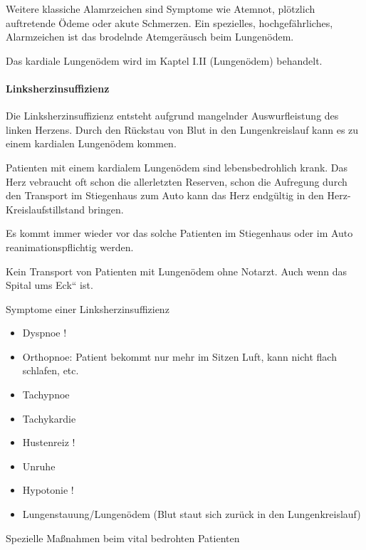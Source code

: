 \documentclass{article}
\begin{document}
Weitere klassiche Alamrzeichen sind Symptome wie Atemnot, pl\"otzlich
auftretende \"Odeme oder akute Schmerzen. Ein spezielles,
hochgef\"ahrliches, Alarmzeichen ist das brodelnde Atemger\"ausch beim
Lungen\"odem. 

Das kardiale Lungen\"odem wird im Kaptel
I.II{\guillemotright}\pageref{bkm:RefHeading36561325} (Lungen\"odem)
behandelt. 

\paragraph[Linksherzinsuffizienz]{Linksherzinsuffizienz}
Die Linksherzinsuffizienz entsteht aufgrund
mangelnder Auswurfleistung des linken Herzens. Durch den R\"uckstau von
Blut in den Lungenkreislauf kann es zu einem kardialen Lungen\"odem
kommen. 

Patienten mit einem kardialem Lungen\"odem sind lebensbedrohlich krank.
Das Herz vebraucht oft schon die allerletzten Reserven, schon die
Aufregung durch den Transport im Stiegenhaus zum Auto kann das Herz
endg\"ultig in den Herz-Kreislaufstillstand bringen. 

Es kommt immer wieder vor das solche Patienten im Stiegenhaus oder im
Auto reanimationspflichtig werden. 

Kein Transport von Patienten mit Lungen\"odem ohne Notarzt. Auch wenn
das Spital {\quotedblbase}um{\textquotesingle}s Eck{\textquotedblleft}
ist.

Symptome einer Linksherzinsuffizienz

\begin{itemize}
\item Dyspnoe !

\end{itemize}
\begin{itemize}
\item Orthopnoe: Patient bekommt nur mehr im Sitzen Luft, kann nicht
flach schlafen, etc.

\end{itemize}
\begin{itemize}
\item Tachypnoe

\item Tachykardie 

\item Hustenreiz !

\item Unruhe

\item Hypotonie !

\item Lungenstauung/Lungen\"odem (Blut staut sich zur\"uck in den
Lungenkreislauf)

\end{itemize}
Spezielle Ma{\ss}nahmen beim vital bedrohten Patienten
\end{document}

